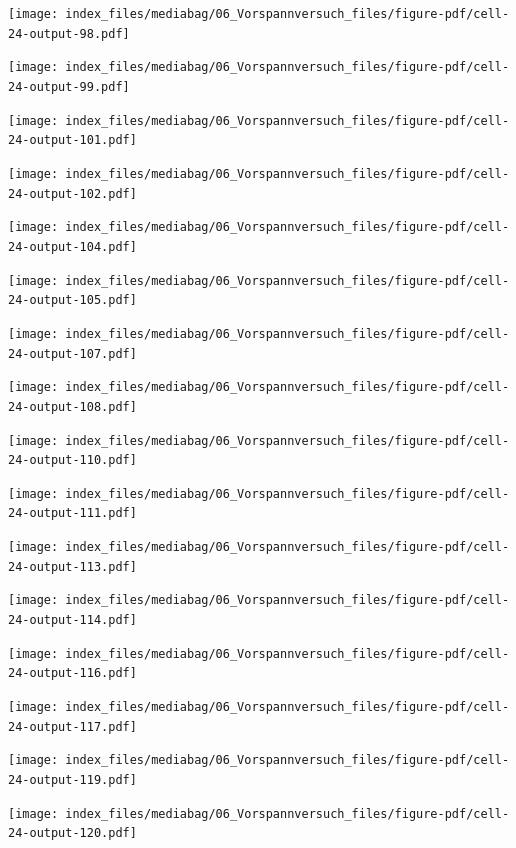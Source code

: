 \documentclass[
  11pt,
  letterpaper,
]{scrreprt}
\begin{document}
\newpage{}

\texttt{[image: index\_files/mediabag/06\_Vorspannversuch\_files/figure-pdf/cell-24-output-98.pdf]}

\texttt{[image: index\_files/mediabag/06\_Vorspannversuch\_files/figure-pdf/cell-24-output-99.pdf]}

\newpage{}

\texttt{[image: index\_files/mediabag/06\_Vorspannversuch\_files/figure-pdf/cell-24-output-101.pdf]}

\texttt{[image: index\_files/mediabag/06\_Vorspannversuch\_files/figure-pdf/cell-24-output-102.pdf]}

\newpage{}

\texttt{[image: index\_files/mediabag/06\_Vorspannversuch\_files/figure-pdf/cell-24-output-104.pdf]}

\texttt{[image: index\_files/mediabag/06\_Vorspannversuch\_files/figure-pdf/cell-24-output-105.pdf]}

\newpage{}

\texttt{[image: index\_files/mediabag/06\_Vorspannversuch\_files/figure-pdf/cell-24-output-107.pdf]}

\texttt{[image: index\_files/mediabag/06\_Vorspannversuch\_files/figure-pdf/cell-24-output-108.pdf]}

\newpage{}

\texttt{[image: index\_files/mediabag/06\_Vorspannversuch\_files/figure-pdf/cell-24-output-110.pdf]}

\texttt{[image: index\_files/mediabag/06\_Vorspannversuch\_files/figure-pdf/cell-24-output-111.pdf]}

\newpage{}

\texttt{[image: index\_files/mediabag/06\_Vorspannversuch\_files/figure-pdf/cell-24-output-113.pdf]}

\texttt{[image: index\_files/mediabag/06\_Vorspannversuch\_files/figure-pdf/cell-24-output-114.pdf]}

\newpage{}

\texttt{[image: index\_files/mediabag/06\_Vorspannversuch\_files/figure-pdf/cell-24-output-116.pdf]}

\texttt{[image: index\_files/mediabag/06\_Vorspannversuch\_files/figure-pdf/cell-24-output-117.pdf]}

\newpage{}

\texttt{[image: index\_files/mediabag/06\_Vorspannversuch\_files/figure-pdf/cell-24-output-119.pdf]}

\texttt{[image: index\_files/mediabag/06\_Vorspannversuch\_files/figure-pdf/cell-24-output-120.pdf]}
\end{document}
